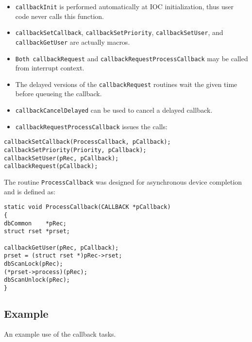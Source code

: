 \begin{itemize}\item \verb|callbackInit| is performed automatically at IOC initialization, thus user code never calls this function.

\item \verb|callbackSetCallback|, \verb|callbackSetPriority|, \verb|callbackSetUser|, and \verb|callbackGetUser| are 
actually macros.

\item \verb|Both callbackRequest| and \verb|callbackRequestProcessCallback| may be called from interrupt context.

\item The delayed versions of the \verb|callbackRequest| routines wait the given time before queueing the callback.

\item \verb|callbackCancelDelayed| can be used to cancel a delayed callback.

\item \verb|callbackRequestProcessCallback| issues the calls:

\end{itemize}\begin{verbatim}
callbackSetCallback(ProcessCallback, pCallback);
callbackSetPriority(Priority, pCallback);
callbackSetUser(pRec, pCallback);
callbackRequest(pCallback);

\end{verbatim}\begin{description}\item The routine \verb|ProcessCallback| was designed for asynchronous device completion and is defined as:

\end{description}\begin{verbatim}
static void ProcessCallback(CALLBACK *pCallback)
{
dbCommon    *pRec;
struct rset *prset;
 
callbackGetUser(pRec, pCallback);
prset = (struct rset *)pRec->rset;
dbScanLock(pRec);
(*prset->process)(pRec);
dbScanUnlock(pRec);
}
\end{verbatim}\subsection{Example}

An example use of the callback tasks.

